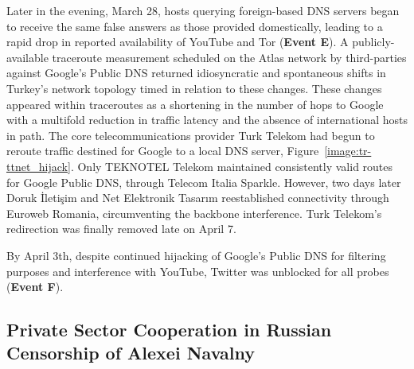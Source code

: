 Later in the evening, March 28, hosts querying foreign-based DNS servers began to
receive the same false answers as those provided domestically, leading to a
rapid drop in reported availability of YouTube and Tor (\textbf{Event E}). A
publicly-available traceroute measurement scheduled on the Atlas network by
third-parties against Google's Public DNS returned idiosyncratic and
spontaneous shifts in Turkey's network topology timed in relation to these
changes. These changes appeared within traceroutes as a shortening in the
number of hops to Google with a multifold reduction in traffic latency and the
absence of international hosts in path. The core telecommunications provider
Turk Telekom had begun to reroute traffic destined for Google to a local DNS
server, Figure~\ref{image:tr-ttnet_hijack}. Only TEKNOTEL Telekom maintained
consistently valid routes for Google Public DNS, through Telecom Italia
Sparkle. However, two days later Doruk \.{I}leti\c{s}im and Net Elektronik
Tasar{\i}m reestablished connectivity through Euroweb Romania, circumventing the backbone interference. Turk Telekom's redirection was finally removed late on April 7.

By April 3th, despite continued hijacking of Google's Public DNS for filtering
purposes and interference with YouTube, Twitter was unblocked for all probes
(\textbf{Event F}).

\subsection{Private Sector Cooperation in Russian Censorship of Alexei Navalny}
\label{sec:russia}


